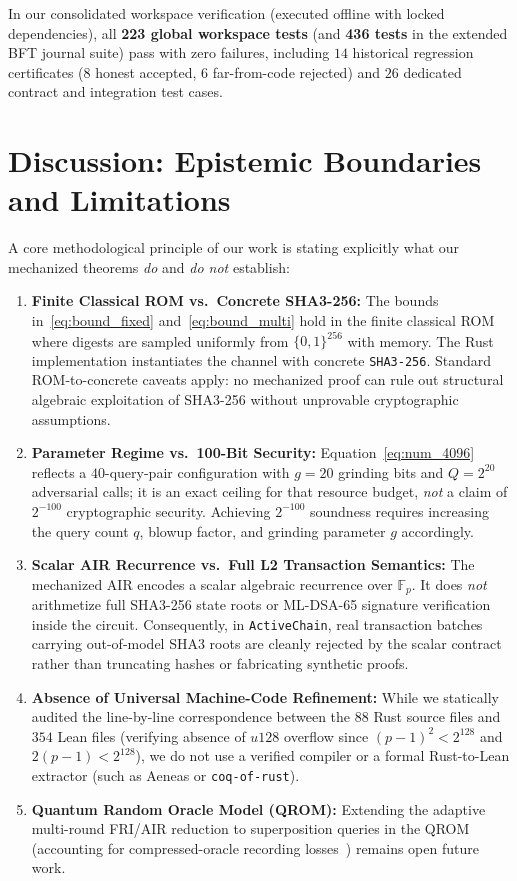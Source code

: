 \documentclass[conference]{IEEEtran}
\theoremstyle{definition}
\begin{document}
In our consolidated workspace verification (executed offline with locked dependencies), all \textbf{223 global workspace tests} (and \textbf{436 tests} in the extended BFT journal suite) pass with zero failures, including $14$ historical regression certificates ($8$ honest accepted, $6$ far-from-code rejected) and $26$ dedicated contract and integration test cases.

\section{Discussion: Epistemic Boundaries and Limitations}
\label{sec:limitations}

A core methodological principle of our work is stating explicitly what our mechanized theorems \emph{do} and \emph{do not} establish:

\begin{enumerate}
    \setlength{\itemsep}{2pt}
    \item \textbf{Finite Classical ROM vs.\ Concrete SHA3-256:} The bounds in~\eqref{eq:bound_fixed} and~\eqref{eq:bound_multi} hold in the finite classical ROM where digests are sampled uniformly from $\{0,1\}^{256}$ with memory. The Rust implementation instantiates the channel with concrete \texttt{SHA3-256}. Standard ROM-to-concrete caveats apply: no mechanized proof can rule out structural algebraic exploitation of SHA3-256 without unprovable cryptographic assumptions.
    \item \textbf{Parameter Regime vs.\ 100-Bit Security:} Equation~\eqref{eq:num_4096} reflects a $40$-query-pair configuration with $g = 20$ grinding bits and $Q = 2^{20}$ adversarial calls; it is an exact ceiling for that resource budget, \emph{not} a claim of $2^{-100}$ cryptographic security. Achieving $2^{-100}$ soundness requires increasing the query count $q$, blowup factor, and grinding parameter $g$ accordingly.
    \item \textbf{Scalar AIR Recurrence vs.\ Full L2 Transaction Semantics:} The mechanized AIR encodes a scalar algebraic recurrence over $\mathbb{F}_p$. It does \emph{not} arithmetize full SHA3-256 state roots or ML-DSA-65 signature verification inside the circuit. Consequently, in \texttt{ActiveChain}, real transaction batches carrying out-of-model SHA3 roots are cleanly rejected by the scalar contract rather than truncating hashes or fabricating synthetic proofs.
    \item \textbf{Absence of Universal Machine-Code Refinement:} While we statically audited the line-by-line correspondence between the $88$ Rust source files and $354$ Lean files (verifying absence of $u128$ overflow since $(p-1)^2 < 2^{128}$ and $2(p-1) < 2^{128}$), we do not use a verified compiler or a formal Rust-to-Lean extractor (such as Aeneas or \texttt{coq-of-rust}).
    \item \textbf{Quantum Random Oracle Model (QROM):} Extending the adaptive multi-round FRI/AIR reduction to superposition queries in the QROM (accounting for compressed-oracle recording losses~\cite{zhandry2019record,chiesa2020post}) remains open future work.
\end{enumerate}
\end{document}
